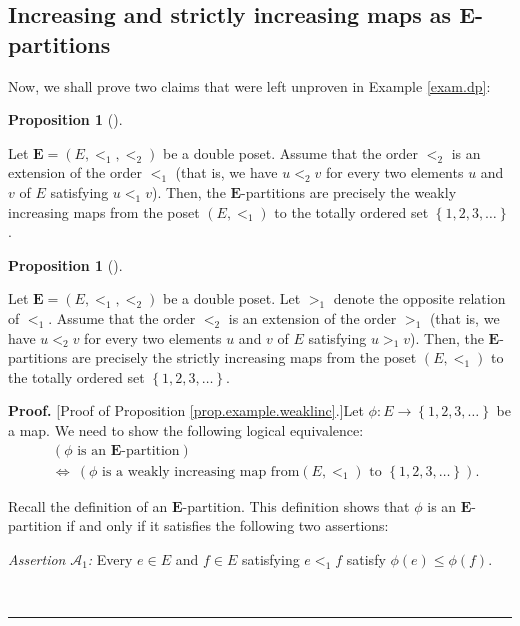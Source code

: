 \documentclass[numbers=enddot,12pt,final,onecolumn,notitlepage,abstracton]{scrartcl}
\theoremstyle{definition}
\newtheorem{prop}[theo]{Proposition}
\newenvironment{proposition}[1][]
{\begin{prop}[#1]\begin{leftbar}}
{\end{leftbar}\end{prop}}
\newenvironment{proof}[1][Proof]{\noindent\textbf{#1.} }{\ \rule{0.5em}{0.5em}}
\newenvironment{verlong}{}{}
\begin{document}
\begin{verlong}
\begin{footnotesize}
\subsection{Increasing and strictly increasing maps as $\mathbf{E}%
$-partitions}

Now, we shall prove two claims that were left unproven in Example
\ref{exam.dp}:

\begin{proposition}
\label{prop.example.weaklinc}Let $\mathbf{E}=\left(  E,<_{1},<_{2}\right)  $
be a double poset. Assume that the order $<_{2}$ is an extension of the order
$<_{1}$ (that is, we have $u<_{2}v$ for every two elements $u$ and $v$ of $E$
satisfying $u<_{1}v$). Then, the $\mathbf{E}$-partitions are precisely the
weakly increasing maps from the poset $\left(  E,<_{1}\right)  $ to the
totally ordered set $\left\{  1,2,3,\ldots\right\}  $.
\end{proposition}

\begin{proposition}
\label{prop.example.strictinc}Let $\mathbf{E}=\left(  E,<_{1},<_{2}\right)  $
be a double poset. Let $>_{1}$ denote the opposite relation of $<_{1}$. Assume
that the order $<_{2}$ is an extension of the order $>_{1}$ (that is, we have
$u<_{2}v$ for every two elements $u$ and $v$ of $E$ satisfying $u>_{1}v$).
Then, the $\mathbf{E}$-partitions are precisely the strictly increasing maps
from the poset $\left(  E,<_{1}\right)  $ to the totally ordered set $\left\{
1,2,3,\ldots\right\}  $.
\end{proposition}

\begin{proof}
[Proof of Proposition \ref{prop.example.weaklinc}.]Let $\phi:E\rightarrow
\left\{  1,2,3,\ldots\right\}  $ be a map. We need to show the following
logical equivalence:%
\begin{align}
&  \left(  \phi\text{ is an }\mathbf{E}\text{-partition}\right) \nonumber\\
&  \Longleftrightarrow\ \left(  \phi\text{ is a weakly increasing map from
}\left(  E,<_{1}\right)  \text{ to }\left\{  1,2,3,\ldots\right\}  \right)  .
\label{pf.prop.example.weaklinc.goal}%
\end{align}


Recall the definition of an $\mathbf{E}$-partition. This definition shows that
$\phi$ is an $\mathbf{E}$-partition if and only if it satisfies the following
two assertions:

\textit{Assertion }$\mathcal{A}_{1}$\textit{:} Every $e\in E$ and $f\in E$
satisfying $e<_{1}f$ satisfy $\phi\left(  e\right)  \leq\phi\left(  f\right)
$.


\end{proof}
\end{footnotesize}
\end{verlong}
\end{document}
